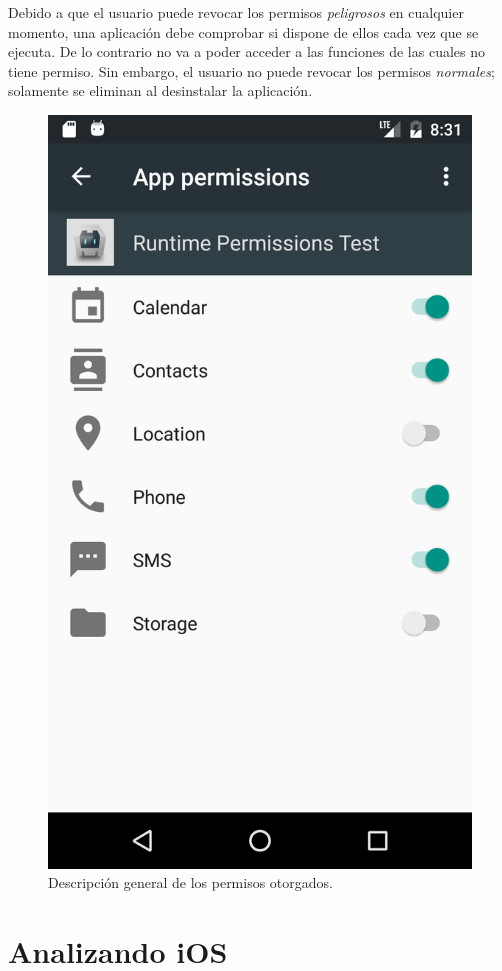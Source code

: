 Debido a que el usuario puede revocar los permisos \textit{peligrosos} en cualquier momento, una aplicación debe comprobar si dispone de ellos cada vez que se ejecuta. De lo contrario no va a poder acceder a las funciones de las cuales no tiene permiso. Sin embargo, el usuario no puede revocar los permisos \textit{normales}; solamente se eliminan al desinstalar la aplicación.
\begin{figure}[hbtp]
    \centering
        \includegraphics[width=.3\linewidth]{imgs/chapter1/app-permissions}
    \caption{Descripción general de los permisos otorgados.}
	\label{fig:ch03:app-permissions-overview}
\end{figure}
\section{Analizando iOS}
